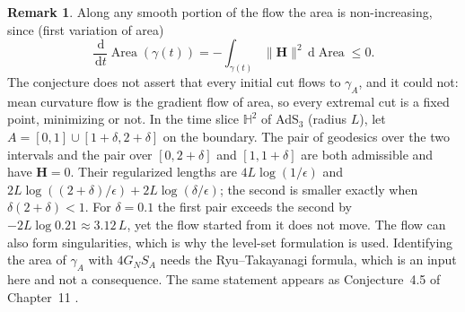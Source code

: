 \documentclass[11pt,a4paper,reqno]{amsart}
\theoremstyle{definition}
\newtheorem{remark}[theorem]{Remark}
\numberwithin{equation}{section}
\providecommand{\Area}{\operatorname{Area}}
\newcommand{\dif}{\,\mathrm{d}}
\providecommand{\Area}{\mathrm{Area}}
\begin{document}
\begin{remark}
Along any smooth portion of the flow the area is non-increasing, since (first variation of area)
\[
\frac{\dif}{\dif t}\Area(\gamma(t)) = -\int_{\gamma(t)} \|\mathbf{H}\|^2 \dif\Area \le 0 .
\]
The conjecture does not assert that every initial cut flows to $\gamma_A$, and it could not: mean curvature flow is the gradient flow of area, so every extremal cut is a fixed point, minimizing or not. In the time slice $\mathbb{H}^2$ of AdS$_3$ (radius $L$), let $A = [0,1] \cup [1+\delta, 2+\delta]$ on the boundary. The pair of geodesics over the two intervals and the pair over $[0, 2+\delta]$ and $[1, 1+\delta]$ are both admissible and have $\mathbf{H} = 0$. Their regularized lengths are $4L\log(1/\epsilon)$ and $2L\log((2+\delta)/\epsilon) + 2L\log(\delta/\epsilon)$; the second is smaller exactly when $\delta(2+\delta) < 1$. For $\delta = 0.1$ the first pair exceeds the second by $-2L\log 0.21 \approx 3.12\,L$, yet the flow started from it does not move. The flow can also form singularities, which is why the level-set formulation is used. Identifying the area of $\gamma_A$ with $4 G_N S_A$ needs the Ryu--Takayanagi formula, which is an input here and not a consequence. The same statement appears as Conjecture~4.5 of Chapter~11 \cite{silvafilho2026spacetime}.
\end{remark}
\end{document}
